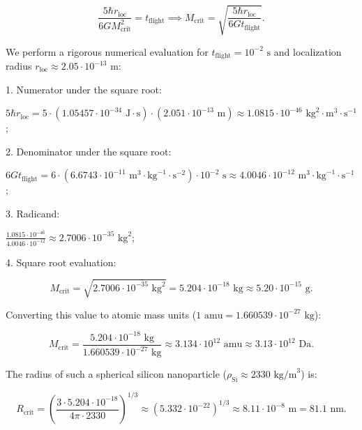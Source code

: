 \documentclass[11pt,a4paper]{article}
\theoremstyle{definition}
\begin{document}
\begin{equation}\label{eq:5.42}\tag{5.42}
\frac{5 \hbar r_{\text{loc}}}{6 G M_{\text{crit}}^2} = t_{\text{flight}} \implies M_{\text{crit}} = \sqrt{\frac{5 \hbar r_{\text{loc}}}{6 G t_{\text{flight}}}}.
\end{equation}

We perform a rigorous numerical evaluation for $t_{\text{flight}} = 10^{-2}\text{ s}$ and localization radius $r_{\text{loc}} \approx 2.05 \cdot 10^{-13}\text{ m}$:

1. Numerator under the square root:

   $5 \hbar r_{\text{loc}} = 5 \cdot (1.05457 \cdot 10^{-34}\text{ J}\cdot\text{s}) \cdot (2.051 \cdot 10^{-13}\text{ m}) \approx 1.0815 \cdot 10^{-46}\text{ kg}^2\cdot\text{m}^3\cdot\text{s}^{-1}$;

2. Denominator under the square root:

   $6 G t_{\text{flight}} = 6 \cdot (6.6743 \cdot 10^{-11}\text{ m}^3\cdot\text{kg}^{-1}\cdot\text{s}^{-2}) \cdot 10^{-2}\text{ s} \approx 4.0046 \cdot 10^{-12}\text{ m}^3\cdot\text{kg}^{-1}\cdot\text{s}^{-1}$;

3. Radicand:

   $\frac{1.0815 \cdot 10^{-46}}{4.0046 \cdot 10^{-12}} \approx 2.7006 \cdot 10^{-35}\text{ kg}^2$;

4. Square root evaluation:

\begin{equation}\label{eq:5.43}\tag{5.43}
M_{\text{crit}} = \sqrt{2.7006 \cdot 10^{-35}\text{ kg}^2} = 5.204 \cdot 10^{-18}\text{ kg} \approx 5.20 \cdot 10^{-15}\text{ g}.
\end{equation}

Converting this value to atomic mass units ($1\text{ amu} = 1.660539 \cdot 10^{-27}\text{ kg}$):

\begin{equation}\label{eq:5.44}\tag{5.44}
M_{\text{crit}} = \frac{5.204 \cdot 10^{-18}\text{ kg}}{1.660539 \cdot 10^{-27}\text{ kg}} \approx 3.134 \cdot 10^{12}\text{ amu} \approx 3.13 \cdot 10^{12}\text{ Da}.
\end{equation}

The radius of such a spherical silicon nanoparticle ($\rho_{\text{Si}} \approx 2330\text{ kg/m}^3$) is:

\begin{equation}\label{eq:5.45}\tag{5.45}
R_{\text{crit}} = \left( \frac{3 \cdot 5.204 \cdot 10^{-18}}{4\pi \cdot 2330} \right)^{1/3} \approx (5.332 \cdot 10^{-22})^{1/3} \approx 8.11 \cdot 10^{-8}\text{ m} = 81.1\text{ nm}.
\end{equation}
\end{document}
